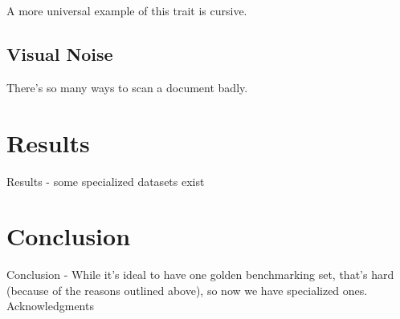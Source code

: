 \documentclass[sigplan,screen,nonacm]{acmart-tagged}
\begin{document}
A more universal example of this trait is cursive. 

\subsection{Visual Noise}
\label{sec:Noise}

There’s so many ways to scan a document badly. \cite{Hegghamer:2022}

\section{Results}
\label{sec:Results}

Results - some specialized datasets exist \cite{Fateh:2024,Hegghamer:2022}

\section{Conclusion}
\label{sec:Conclusion}

Conclusion - While it's ideal to have one golden benchmarking set, that's hard (because of the reasons outlined above), so now we have specialized ones.
Acknowledgments

\end{document}
